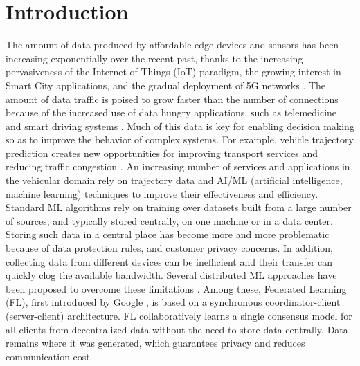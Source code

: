 \section{Introduction}
\vspace{-5pt}
The amount of data produced by affordable edge devices and sensors has been increasing exponentially over the recent past, thanks to the increasing pervasiveness of the Internet of Things (IoT) paradigm, the growing interest in Smart City applications, and the gradual deployment of 5G networks \cite{sta2017quality,cheng2015building,8493126}. 
The amount of data traffic is poised to grow faster than the number of connections because of the increased use of data hungry applications, such as telemedicine and smart driving systems \cite{cisco2020cisco}. Much of this data is key for enabling decision making so as to improve the behavior of complex systems. For example, vehicle trajectory prediction creates new opportunities for improving transport services and reducing traffic congestion \cite{8336896}. An increasing number of services and applications in the vehicular domain rely on trajectory data and AI/ML (artificial intelligence, machine learning) techniques to improve their effectiveness and efficiency.\\
Standard ML algorithms rely on training over datasets built  from a large number of sources, and typically stored centrally, on one machine or in a data center. Storing such data in a central place has become more and more problematic because of data protection rules, and customer privacy concerns. In addition, collecting data from different devices can be inefficient and their transfer can quickly clog the available bandwidth. 
Several distributed ML approaches have been proposed to overcome these limitations \cite{smith2017federated,kraska2013mlbase}. Among these, Federated Learning (FL), first introduced by Google \cite{mcmahan2017communication}, %
is based on a synchronous coordinator-client (server-client) architecture. FL collaboratively learns a single consensus model for all clients from decentralized data without the need to store data centrally. Data remains where it was generated, which guarantees privacy and reduces communication cost. 
